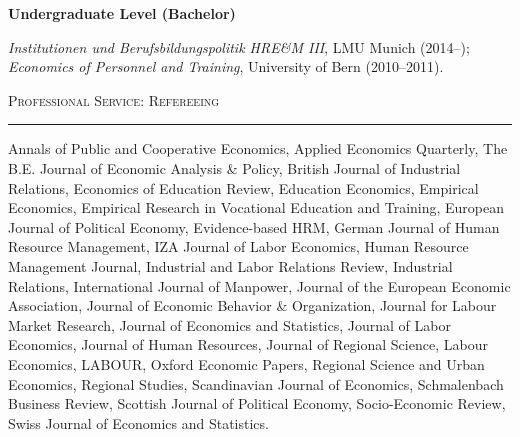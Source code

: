 \documentclass[11pt,a4paper]{article}
\newcommand{\cvsection}[1]{%
  \vspace{1.1em}%
  {\large\textsc{#1}}\par
  \vspace{0.15em}\hrule\vspace{0.65em}%
}
\begin{document}
\vspace{0.5em}
\textbf{Undergraduate Level (Bachelor)}\par
\textit{Institutionen und Berufsbildungspolitik HRE\&M III}, LMU Munich (2014--); \textit{Economics of Personnel and Training}, University of Bern (2010--2011).

\cvsection{Professional Service: Refereeing}

{\small
Annals of Public and Cooperative Economics, Applied Economics Quarterly, The B.E. Journal of Economic Analysis \& Policy, British Journal of Industrial Relations, Economics of Education Review, Education Economics, Empirical Economics, Empirical Research in Vocational Education and Training, European Journal of Political Economy, Evidence-based HRM, German Journal of Human Resource Management, IZA Journal of Labor Economics, Human Resource Management Journal, Industrial and Labor Relations Review, Industrial Relations, International Journal of Manpower, Journal of the European Economic Association, Journal of Economic Behavior \& Organization, Journal for Labour Market Research, Journal of Economics and Statistics, Journal of Labor Economics, Journal of Human Resources, Journal of Regional Science, Labour Economics, LABOUR, Oxford Economic Papers, Regional Science and Urban Economics, Regional Studies, Scandinavian Journal of Economics, Schmalenbach Business Review, Scottish Journal of Political Economy, Socio-Economic Review, Swiss Journal of Economics and Statistics.
}
\end{document}
